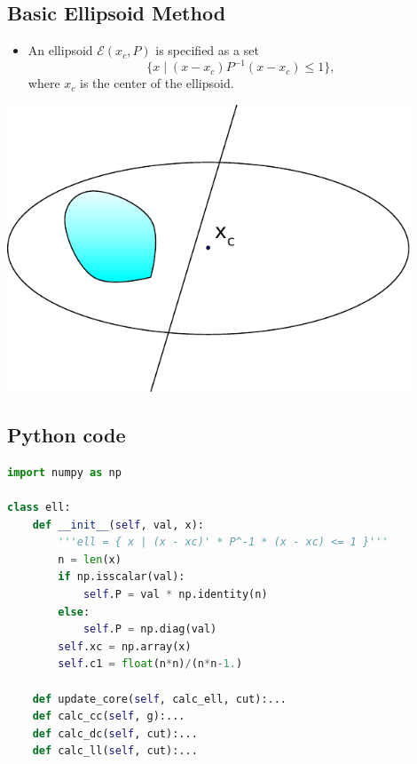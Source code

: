\documentclass[]{article}
\providecommand{\tightlist}{%
  \setlength{\itemsep}{0pt}\setlength{\parskip}{0pt}}
\begin{document}
\hypertarget{basic-ellipsoid-method}{%
\subsection{Basic Ellipsoid Method}\label{basic-ellipsoid-method}}

\begin{itemize}
\tightlist
\item
  An ellipsoid \(\mathcal{E}(x_c, P)\) is specified as a set
  \[\{x \mid (x-x_c)P^{-1}(x-x_c) \leq 1 \},\] where \(x_c\) is the
  center of the ellipsoid.
\end{itemize}

\includegraphics[width=0.9\textwidth,height=\textheight]{ellipsoid.files/ellipsoid.pdf}

\hypertarget{python-code-2}{%
\subsection{Python code}\label{python-code-2}}

\begin{lstlisting}[language=Python]
import numpy as np

class ell:
    def __init__(self, val, x):
        '''ell = { x | (x - xc)' * P^-1 * (x - xc) <= 1 }'''
        n = len(x)
        if np.isscalar(val):
            self.P = val * np.identity(n)
        else:
            self.P = np.diag(val)
        self.xc = np.array(x)
        self.c1 = float(n*n)/(n*n-1.)

    def update_core(self, calc_ell, cut):...
    def calc_cc(self, g):...
    def calc_dc(self, cut):...
    def calc_ll(self, cut):...
\end{lstlisting}
\end{document}
